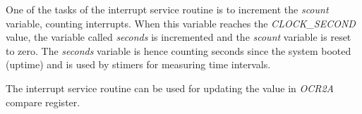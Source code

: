 One of the tasks of the interrupt service routine is to increment the {\it{scount}} variable,
counting interrupts.
When this variable reaches the {\it{CLOCK\_SECOND}} value, the variable called
{\it{seconds}} is incremented and the {\it{scount}} variable is reset to zero.
The {\it{seconds}} variable is hence counting seconds since the system booted (uptime)
and is used by stimers for measuring time intervals.

The interrupt service routine can be used for updating the value in {\it{OCR2A}} compare register.
